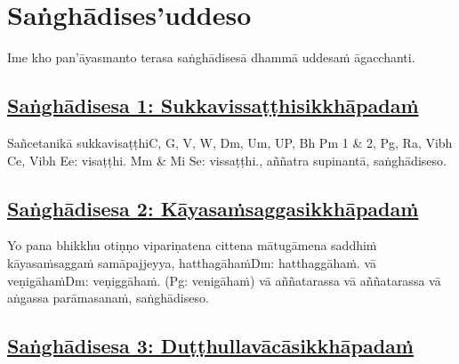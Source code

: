 
\setsecheadstyle{\sectionFmt}
\section{Saṅghādises'uddeso}
\label{sd}

\begin{intro}
	Ime kho pan'āyasmanto terasa saṅghādisesā dhammā uddesaṁ āgacchanti.
\end{intro}

\subsection*{\hyperref[comm1]{Saṅghādisesa 1: Sukkavissaṭṭhisikkhāpadaṁ}}

\label{sd1}

Sañcetanikā sukkavisaṭṭhi\makeatletter\hyperlink{endnote-appendix}\makeatother C, G, V, W, Dm, Um, UP, Bh Pm 1 & 2, Pg, Ra, Vibh Ce, Vibh Ee: visaṭṭhi. Mm & Mi Se: vissaṭṭhi., aññatra supinantā, saṅghādiseso.



\subsection*{\hyperref[comm2]{Saṅghādisesa 2: Kāyasaṁsaggasikkhāpadaṁ}}
\label{sd2}

Yo pana bhikkhu otiṇṇo vipariṇatena cittena mātugāmena saddhiṁ kāyasaṁsaggaṁ samāpajjeyya, hatthagāhaṁ\makeatletter\hyperlink{endnote-appendix}\makeatother Dm: hatthaggāhaṁ. vā veṇigāhaṁ\makeatletter\hyperlink{endnote-appendix}\makeatother Dm: veṇiggāhaṁ. (Pg: venigāhaṁ) vā aññatarassa vā aññatarassa vā aṅgassa parāmasanaṁ, saṅghādiseso.



\subsection*{\hyperref[comm3]{Saṅghādisesa 3: Duṭṭhullavācāsikkhāpadaṁ}}
\label{sd3}

